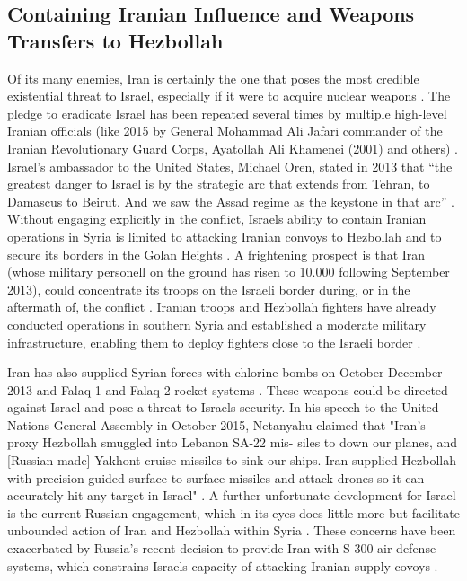 \documentclass[a4paper]{article}\twocolumn
\begin{document}
\subsection{Containing Iranian Influence and Weapons Transfers to Hezbollah}
Of its many enemies, Iran is certainly the one that poses the most credible existential threat to Israel, especially if it were to acquire nuclear weapons \newline \cite{Hanauer2015}. The pledge to eradicate Israel has been repeated several times by multiple high-level Iranian officials (like 2015 by General Mohammad Ali Jafari commander of the Iranian Revolutionary Guard Corps, Ayatollah Ali Khamenei (2001) and others)  \cite{goldberg_2015,reuters_2015}. Israel’s ambassador to the United States, Michael Oren, stated in 2013 that “the greatest danger to Israel is by the strategic arc that extends from Tehran, to Damascus to Beirut. And we saw the Assad regime as the keystone in that arc” \cite{williams_2013}. Without engaging explicitly in the conflict, Israels ability to contain Iranian operations in Syria is limited to attacking Iranian convoys to Hezbollah and to secure its borders in the Golan Heights \cite{Hanauer2015}. A frightening prospect is that Iran (whose military personell on the ground has risen to 10.000 following September 2013), could concentrate its troops on the Israeli border during, or in the aftermath of, the conflict \cite{Hanauer2015,Tabrizi2016}. Iranian troops and Hezbollah fighters have already conducted operations in southern Syria and established a moderate military infrastructure, enabling them to deploy fighters close to the Israeli border \cite{Hanauer2015}. \newline

Iran has also supplied Syrian forces with chlorine-bombs on October-December 2013 and Falaq-1 and Falaq-2 rocket systems \cite{Tabrizi2016}. These weapons could be directed against Israel and pose a threat to Israels security. In his speech to the United Nations General Assembly in October 2015, Netanyahu claimed that 
"Iran’s proxy Hezbollah smuggled into Lebanon SA-22 mis- siles to down our planes, and [Russian-made] Yakhont cruise missiles to sink our ships. Iran supplied Hezbollah with precision-guided surface-to-surface missiles and attack drones so it can accurately hit any target in Israel" \cite{nethanyahu2015}.
A further unfortunate development for Israel is the current Russian engagement, which in its eyes does little more but facilitate unbounded action of Iran and Hezbollah within Syria \cite{aronson_2017,Rabinovich2012,Hanauer2015}.
These concerns have been exacerbated by Russia’s recent decision to provide Iran with S-300 air defense systems, which constrains Israels capacity of attacking Iranian supply covoys \cite{Hanauer2015}.\newline
\end{document}
